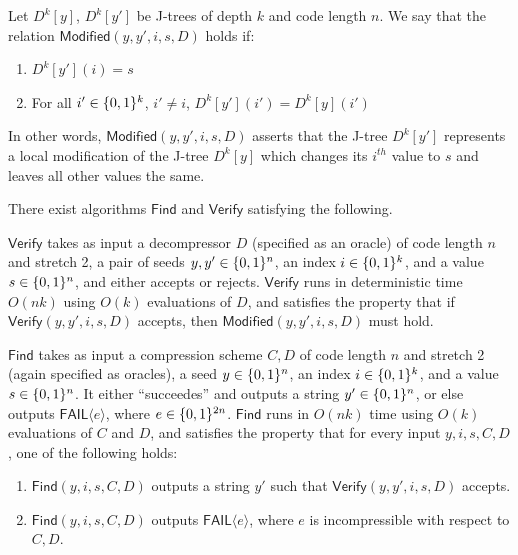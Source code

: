 \begin{definition}
Let $D^k[y]$, $D^k[y']$ be J-trees of depth $k$ and code length $n$. We say that the relation $\mathsf{Modified}(y,y',i,s,D)$ holds if:
\begin{enumerate}
    \item $D^k[y'](i)=s$
    \item For all $i' \in \{0,1\}^k$, $i'\neq i$, $D^k[y'](i') = D^k[y](i')$
\end{enumerate}
\end{definition}
In other words, $\mathsf{Modified}(y,y',i,s,D)$ asserts that the J-tree $D^k[y']$ represents a local modification of the J-tree $D^k[y]$ which changes its $i^{th}$ value to $s$ and leaves all other values the same.
\begin{lemma}\label{lossy:lem:updates}
 There exist algorithms $\mathsf{Find}$ and $\mathsf{Verify}$ satisfying the following. 

$\mathsf{Verify}$ takes as input a decompressor $D$ (specified as an oracle) of code length $n$ and stretch 2, a pair of seeds $y,y' \in \{0,1\}^n$, an index $i \in \{0,1\}^k$, and a value $s \in \{0,1\}^n$, and either accepts or rejects. $\mathsf{Verify}$ runs in deterministic time $O(nk)$ using $O(k)$ evaluations of $D$, and satisfies the property that if $\mathsf{Verify}(y,y',i,s,D)$ accepts, then $\mathsf{Modified}(y,y',i,s,D)$ must hold.

$\mathsf{Find}$ takes as input a compression scheme $C,D$ of code length $n$ and stretch 2 (again specified as oracles), a seed $y \in \{0,1\}^n$, an index $i \in \{0,1\}^k$, and a value $s \in \{0,1\}^n$. It either ``succeedes'' and outputs a string $y'\in \{0,1\}^n$, or else outputs $\mathsf{FAIL}\langle e \rangle$, where $e \in \{0,1\}^{2n}$. $\mathsf{Find}$ runs in $O(nk)$ time using $O(k)$ evaluations of $C$ and $D$, and satisfies the property that for every input $y,i,s,C,D$, one of the following holds:
\begin{enumerate}
    \item $\mathsf{Find}(y,i,s,C,D)$ outputs a string $y'$ such that $\mathsf{Verify}(y,y',i,s,D)$ accepts.
    \item $\mathsf{Find}(y,i,s,C,D)$ outputs $\mathsf{FAIL}\langle e \rangle$, where $e$ is incompressible with respect to $C,D$.
\end{enumerate}

\end{lemma}

